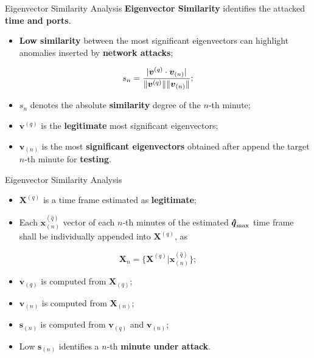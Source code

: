 \documentclass[newPxFont, numfooter, sectionpages]{beamer}
\DeclarePairedDelimiter\abs{\lvert}{\rvert}%
\DeclarePairedDelimiter\norm{\lVert}{\rVert}%
\begin{document}
\begin{frame}{Eigenvector Similarity Analysis}
	\textbf{Eigenvector Similarity} identifies the attacked \textbf{time and ports}.
	\begin{itemize}
	    \item \textbf{Low similarity} between the most significant eigenvectors can highlight anomalies inserted by \textbf{network attacks};
	\end{itemize}
	\begin{equation}
		\label{eq:eq11}
		s_n = \frac{\abs{\boldsymbol{v}^{(q)} \cdot \boldsymbol{v}_{(n)}}}{\norm{\boldsymbol{v}^{(q)}}\norm{\boldsymbol{v}_{(n)}}};
	\end{equation}	
	\begin{itemize}
	    \item $s_n$ denotes the absolute \textbf{similarity} degree of the $n$-th minute;
	    \item $\boldsymbol{v}^{(q)}$ is the \textbf{legitimate} most significant eigenvectors;
	    \item $\boldsymbol{v}_{(n)}$ is the most \textbf{significant eigenvectors} obtained after append the target $n$-th minute for \textbf{testing}.
	\end{itemize}
\end{frame}

\begin{frame}{Eigenvector Similarity Analysis}
	\begin{itemize}
	    \item $\boldsymbol{X}^{(q)}$ is a time frame estimated as \textbf{legitimate};
	    \item Each $\boldsymbol{x}^{(\hat{q})}_{(n)}$ vector of each $n$-th minutes of the estimated $\rm{\boldsymbol{\hat{q}}}_{\rm max}$ time frame shall be individually appended into $\boldsymbol{X}^{(q)}$, as
	\end{itemize}
	\begin{equation}\label{eq:eq12}
		\boldsymbol{X}_{n} = \{\boldsymbol{X}^{(q)} | \boldsymbol{x}^{(\hat{q})}_{(n)}\};
	\end{equation}
	\begin{itemize}
	    \item $\boldsymbol{v}_{(q)}$ is computed from $\boldsymbol{X}_{(q)}$;
	    \item $\boldsymbol{v}_{(n)}$ is computed from $\boldsymbol{X}_{(n)}$;
	    \item $\boldsymbol{s}_{(n)}$ is computed from $\boldsymbol{v}_{(q)}$ and $\boldsymbol{v}_{(n)}$;
	    \item Low $\boldsymbol{s}_{(n)}$ identifies a $n$-th\textbf{ minute under attack}.
	\end{itemize}
\end{frame}
\end{document}
